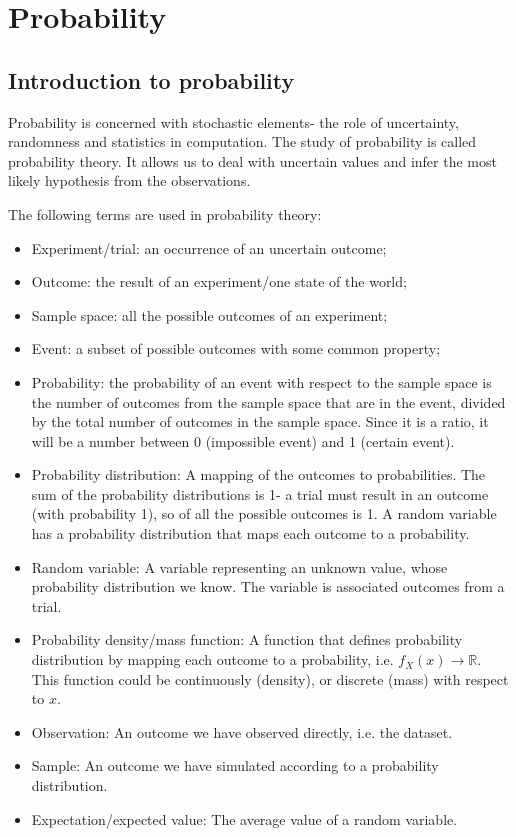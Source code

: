 \documentclass[a4paper, openany]{memoir}
\begin{document}
\chapter{Probability}
\section{Introduction to probability}
Probability is concerned with stochastic elements- the role of uncertainty, randomness and statistics in computation. The study of probability is called probability theory. It allows us to deal with uncertain values and infer the most likely hypothesis from the observations.

The following terms are used in probability theory:
\begin{itemize}
    \item Experiment/trial: an occurrence of an uncertain outcome;
    \item Outcome: the result of an experiment/one state of the world;
    \item Sample space: all the possible outcomes of an experiment;
    \item Event: a subset of possible outcomes with some common property;
    \item Probability: the probability of an event with respect to the sample space is the number of outcomes from the sample space that are in the event, divided by the total number of outcomes in the sample space. Since it is a ratio, it will be a number between 0 (impossible event) and 1 (certain event).
    \item Probability distribution: A mapping of the outcomes to probabilities. The sum of the probability distributions is 1- a trial must result in an outcome (with probability 1), so of all the possible outcomes is 1. A random variable has a probability distribution that maps each outcome to a probability.
    \item Random variable: A variable representing an unknown value, whose probability distribution we know. The variable is associated outcomes from a trial.
    \item Probability density/mass function: A function that defines probability distribution by mapping each outcome to a probability, i.e. $f_X(x) \to \mathbb{R}$. This function could be continuously (density), or discrete (mass) with respect to $x$.
    \item Observation: An outcome we have observed directly, i.e. the dataset.
    \item Sample: An outcome we have simulated according to a probability distribution.
    \item Expectation/expected value: The average value of a random variable.
\end{itemize}
\end{document}
